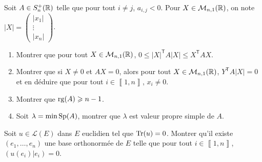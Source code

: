 \documentclass[12pt]{article}
\begin{document}
\begin{exercise}
	Soit $A\in S_n^{+}(\mathbb{R})$ telle que pour tout $i\neq j$, $a_{i,j}<0$. Pour $X\in\mathcal{M}_{n,1}(\mathbb{R})$, on note $\left\lvert X\right\rvert=\begin{pmatrix}
		\left\lvert x_1\right\rvert\\\vdots\\\left\lvert x_n\right\rvert
	\end{pmatrix}$.
	\begin{enumerate}
		\item Montrer que pour tout $X\in\mathcal{M}_{n,1}(\mathbb{R})$, $0\leqslant\left\lvert X\right\rvert^{\mathsf{T}}A\left\lvert X\right\rvert\leqslant X^{\mathsf{T}}AX$.
		\item Montrer que si $X\neq0$ et $AX=0$, alors pour tout $X\in\mathcal{M}_{n,1}(\mathbb{R})$, $Y^{\mathsf{T}}A\left\lvert X\right\rvert=0$ et en déduire que pour tout $i\in\left\llbracket1,n\right\rrbracket$, $x_i\neq0$.
		\item Montrer que $\operatorname{rg}(A)\geqslant n-1$.
		\item Soit $\lambda=\min\operatorname{Sp}(A)$, montrer que $\lambda$ est valeur propre simple de $A$.
	\end{enumerate}
\end{exercise}

\begin{exercise}
	Soit $u\in\mathcal{L}(E)$ dans $E$ euclidien tel que $\operatorname{Tr}(u)=0$. Montrer qu'il existe $(e_{1},\dots,e_n)$ une base orthonormée de $E$ telle que pour tout $i\in\left\llbracket1,n\right\rrbracket$, $(u(e_i)|e_i)=0$.
\end{exercise}
\end{document}
